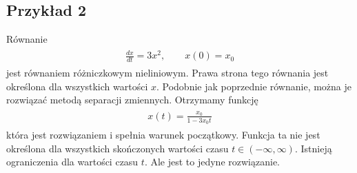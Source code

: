 \documentclass[a4paper,12pt,polish]{sphinxmanual}
\begin{document}
\subsection{Przykład 2}
\label{ch1/chI012:przyklad-2}
Równanie
\label{ch1/chI012:equation-eqn3}\begin{gather}
\begin{split}\frac{dx}{dt}= 3 x^2, \qquad x(0) = x_0\end{split}\label{ch1/chI012-eqn3}
\end{gather}
jest równaniem różniczkowym nieliniowym.   Prawa strona tego równania jest określona dla wszystkich wartości $x$. Podobnie jak poprzednie równanie, można  je rozwiązać metodą separacji zmiennych. Otrzymamy funkcję
\label{ch1/chI012:equation-eqn4}\begin{gather}
\begin{split}x(t) = \frac{x_0}{1-3 x_0 t}\end{split}\label{ch1/chI012-eqn4}
\end{gather}
która jest rozwiązaniem i spełnia warunek początkowy. Funkcja ta nie jest określona dla wszystkich skończonych  wartości czasu $t \in (-\infty, \infty)$.  Istnieją  ograniczenia dla wartości czasu $t$. Ale jest to jedyne rozwiązanie.
\end{document}

